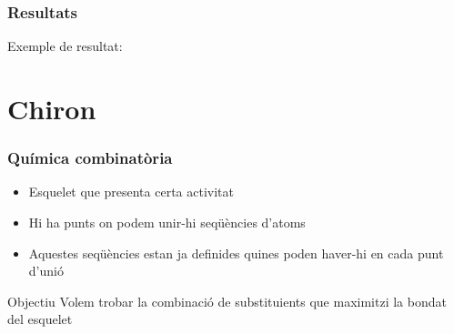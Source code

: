 \documentclass{beamer}
\begin{document}
\begin{frame}
	\frametitle{Resultats}
	Exemple de resultat:
\end{frame}


\section{Chiron} %
\label{sec:Chiron}
\begin{frame}
	\frametitle{Química combinatòria}
	\begin{itemize}
		\item Esquelet que presenta certa activitat
		\item Hi ha punts on podem unir-hi seqüències d'atoms
		\item Aquestes seqüències estan ja definides quines poden haver-hi en cada punt d'unió
	\end{itemize}
	\pause
	\begin{block}{Objectiu}
		Volem trobar la combinació de substituients que maximitzi la bondat del esquelet
	\end{block}
\end{frame}
\end{document}
